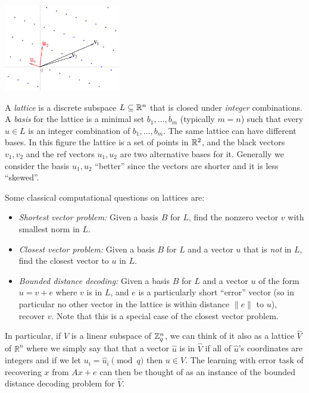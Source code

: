 \begin{marginfigure}
\centering
\includegraphics[width=\linewidth, height=1.5in, keepaspectratio]{../figure/Lattice-reduction.png}
\caption{A \emph{lattice} is a discrete subspace \(L \subseteq {\mathbb{R}}^n\)
that is closed under \emph{integer} combinations. A \emph{basis} for the
lattice is a minimal set \(b_1,\ldots,b_m\) (typically \(m=n\)) such
that every \(u \in L\) is an integer combination of \(b_1,\ldots,b_m\).
The same lattice can have different bases. In this figure the lattice is
a set of points in \({\mathbb{R}}^2\), and the black vectors \(v_1,v_2\) and the
ref vectors \(u_1,u_2\) are two alternative bases for it. Generally we
consider the basis \(u_1,u_2\) ``better'' since the vectors are shorter
and it is less ``skewed''.}
\label{latticebasesfig}
\end{marginfigure}

Some classical computational questions on lattices are:

\begin{itemize}
\item
  \emph{Shortest vector problem:} Given a basis \(B\) for \(L\), find
  the nonzero vector \(v\) with smallest norm in \(L\).
\item
  \emph{Closest vector problem:} Given a basis \(B\) for \(L\) and a
  vector \(u\) that is \emph{not} in \(L\), find the closest vector to
  \(u\) in \(L\).
\item
  \emph{Bounded distance decoding:} Given a basis \(B\) for \(L\) and a
  vector \(u\) of the form \(u=v+e\) where \(v\) is in \(L\), and \(e\)
  is a particularly short ``error'' vector (so in particular no other
  vector in the lattice is within distance \(\|e\|\) to \(u\)), recover
  \(v\). Note that this is a special case of the closest vector problem.
\end{itemize}

In particular, if \(V\) is a linear subspace of \({\mathbb{Z}}_q^n\), we can think
of it also as a lattice \(\hat{V}\) of \(\mathbb{R}^n\) where we simply
say that that a vector \(\hat{u}\) is in \(\hat{V}\) if all of
\(\hat{u}\)'s coordinates are integers and if we let
\(u_i = \hat{u}_i \pmod{q}\) then \(u\in V\). The learning with error
task of recovering \(x\) from \(Ax+e\) can then be thought of as an
instance of the bounded distance decoding problem for \(\hat{V}\).

